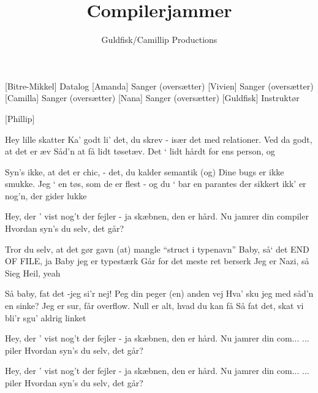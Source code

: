 \documentclass[a4paper,11pt]{article}
\title{Compilerjammer}
\author{Guldfisk/Camillip Productions}
\begin{document}
\maketitle

\begin{roles}
[Bitre-Mikkel] Datalog
[Amanda] Sanger (oversætter)
[Vivien] Sanger (oversætter)
[Camilla] Sanger (oversætter)
[Nana] Sanger (oversætter)
[Guldfisk] Instruktør
\end{roles}

\begin{props}
[Phillip]
\end{props}

\begin{song}
 Hey lille skatter
Ka' godt li' det, du skrev
- især det med relationer.
 Ved da godt, at det er æv
Såd'n at få lidt tøsetæv.
 Det ‘ lidt hårdt for ens person, og

 Syn's ikke, at det er chic,
 - det, du kalder semantik 
(og) Dine bugs er ikke smukke.
Jeg ‘ en tøs, som de er flest
 - og du ‘ bar en parantes
der sikkert  ikk’ er nog’n, der gider lukke

 Hey, der ' vist nog't der fejler
 - ja skæbnen, den er hård.
 Nu jamrer din compiler 
 Hvordan syn's du selv, det går?

 Tror du selv, at det gør gavn
(at) mangle ``struct i typenavn''
 Baby, så‘ det  END OF FILE, ja
 Baby jeg er typestærk
Går for det meste ret berserk
 Jeg er Nazi, så Sieg Heil, yeah

 Så baby, fat det -jeg si’r nej!
Peg din peger (en) anden vej
 Hva’ sku jeg med såd’n en sinke?
Jeg er sur, får overflow.
Null er alt, hvad du kan få
 Så fat det, skat
 vi bli’r sgu’ aldrig linket

 Hey, der ' vist nog't der fejler
 - ja skæbnen, den er hård.
 Nu jamrer din com...
 ... piler 
Hvordan syn's du selv, det går?


 Hey, der ' vist nog't der fejler
 - ja skæbnen, den er hård.
 Nu jamrer din com...
 ... piler 
Hvordan syn's du selv, det går?

\end{song}
\end{document}
